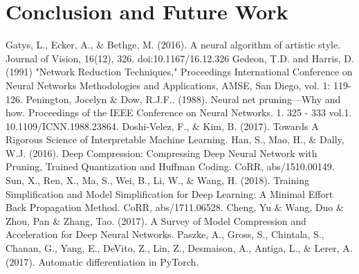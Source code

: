\documentclass[runningheads]{llncs}
\begin{document}
\section{Conclusion and Future Work}

\begin{thebibliography}{8}
Gatys, L., Ecker, A., \& Bethge, M. (2016). A neural algorithm of artistic style. Journal of Vision, 16(12), 326. doi:10.1167/16.12.326
Gedeon, T.D. and Harris, D. (1991) "Network Reduction Techniques," Proceedings International Conference on Neural Networks Methodologies and Applications, AMSE, San Diego, vol. 1: 119-126. 
Penington, Jocelyn \& Dow, R.J.F.. (1988). Neural net pruning—Why and how. Proceedings of the IEEE Conference on Neural Networks. 1. 325 - 333 vol.1. 10.1109/ICNN.1988.23864. 
Doshi-Velez, F., \& Kim, B. (2017). Towards A Rigorous Science of Interpretable Machine Learning.
Han, S., Mao, H., \& Dally, W.J. (2016). Deep Compression: Compressing Deep Neural Network with Pruning, Trained Quantization and Huffman Coding. CoRR, abs/1510.00149.
Sun, X., Ren, X., Ma, S., Wei, B., Li, W., \& Wang, H. (2018). Training Simplification and Model Simplification for Deep Learning: A Minimal Effort Back Propagation Method. CoRR, abs/1711.06528.
Cheng, Yu \& Wang, Duo \& Zhou, Pan \& Zhang, Tao. (2017). A Survey of Model Compression and Acceleration for Deep Neural Networks. 
Paszke, A., Gross, S., Chintala, S., Chanan, G., Yang, E., DeVito, Z., Lin, Z., Desmaison, A., Antiga, L., \& Lerer, A. (2017). Automatic differentiation in PyTorch.
\end{thebibliography}
\end{document}
